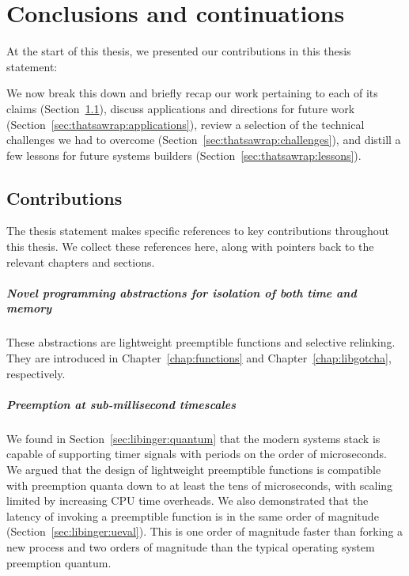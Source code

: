 \chapter{Conclusions and continuations}
\label{chap:thatsawrap}

At the start of this thesis, we presented our contributions in this thesis statement:
\begin{quote}

\end{quote}

We now break this down and briefly recap our work pertaining to each of its claims
(Section~\ref{sec:thatsawrap:contributions}), discuss applications and directions for
future work (Section~\ref{sec:thatsawrap:applications}), review a selection of the
technical challenges we had to overcome (Section~\ref{sec:thatsawrap:challenges}),
and distill a few lessons for future systems builders
(Section~\ref{sec:thatsawrap:lessons}).


\section{Contributions}
\label{sec:thatsawrap:contributions}

The thesis statement makes specific references to key contributions throughout this
thesis.  We collect these references here, along with pointers back to the relevant
chapters and sections.

\paragraph{Novel programming abstractions for isolation of both time and memory}
These abstractions are lightweight preemptible functions and selective relinking.
They are introduced in Chapter~\ref{chap:functions} and Chapter~\ref{chap:libgotcha},
respectively.

\paragraph{Preemption at sub-millisecond timescales}
We found in Section~\ref{sec:libinger:quantum} that the modern systems stack is
capable of supporting timer signals with periods on the order of microseconds.  We
argued that the design of lightweight preemptible functions is compatible with
preemption quanta down to at least the tens of microseconds, with scaling limited by
increasing CPU time overheads.  We also demonstrated that the latency of invoking a
preemptible function is in the same order of magnitude
(Section~\ref{sec:libinger:ueval}).  This is one order of magnitude faster than
forking a new process and two orders of magnitude than the typical operating system
preemption quantum.

